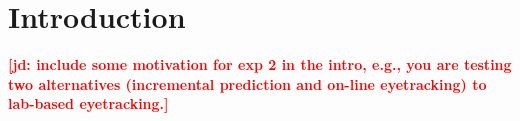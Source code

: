 \documentclass[10pt,letterpaper]{article}
\newcommand{\expref}[1]{Experiment #1}
\newcommand{\jd}[1]{\textcolor{Red}{\textbf{[jd: #1]}}}
\begin{document}

\section{Introduction}

\jd{include some motivation for exp 2 in the intro, e.g., you are testing two alternatives (incremental prediction and on-line eyetracking) to lab-based eyetracking.}
\end{document}
